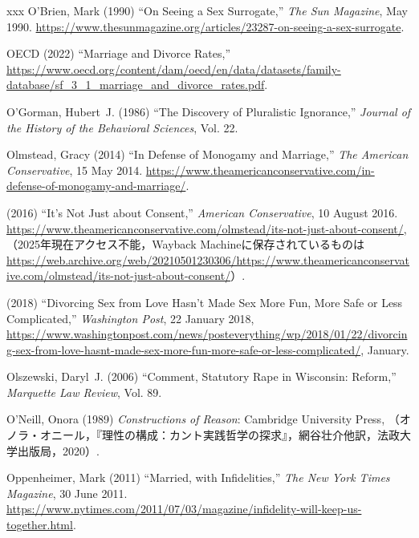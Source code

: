 \documentclass[]{jlreq} \usepackage{mystyle}
\begin{document}
\begin{thebibliography}{xxx}
O'Brien, Mark (1990) ``On Seeing a Sex Surrogate,'' \emph{The Sun Magazine},
  May 1990.
  \url{https://www.thesunmagazine.org/articles/23287-on-seeing-a-sex-surrogate}.

OECD (2022) ``Marriage and Divorce Rates,''
  \url{https://www.oecd.org/content/dam/oecd/en/data/datasets/family-database/sf_3_1_marriage_and_divorce_rates.pdf}.

O'Gorman, Hubert~J. (1986) ``The Discovery of Pluralistic Ignorance,'' \textit{
  Journal of the History of the Behavioral Sciences}, Vol. 22.

Olmstead, Gracy (2014) ``In Defense of Monogamy and Marriage,'' \emph{The
  American Conservative}, 15 May 2014.
  \url{https://www.theamericanconservative.com/in-defense-of-monogamy-and-marriage/}.

 \bysame{}  (2016) ``It's Not Just about Consent,'' \emph{American
  Conservative}, 10 August 2016.
  \url{https://www.theamericanconservative.com/olmstead/its-not-just-about-consent/},
  （2025年現在アクセス不能，Wayback
  Machineに保存されているものは\url{https://web.archive.org/web/20210501230306/https://www.theamericanconservative.com/olmstead/its-not-just-about-consent/}）.

 \bysame{}  (2018) ``Divorcing Sex from Love Hasn't Made Sex More Fun, More
  Safe or Less Complicated,'' \emph{Washington Post}, 22 January 2018,
  \url{https://www.washingtonpost.com/news/posteverything/wp/2018/01/22/divorcing-sex-from-love-hasnt-made-sex-more-fun-more-safe-or-less-complicated/},
  January.

Olszewski, Daryl~J. (2006) ``Comment, Statutory Rape in Wisconsin: Reform,''
  \textit{ Marquette Law Review}, Vol. 89.

O'Neill, Onora (1989)  \textit{ Constructions of Reason}: Cambridge University
  Press,
  （オノラ・オニール，『理性の構成：カント実践哲学の探求』，網谷壮介他訳，法政大学出版局，2020）.

Oppenheimer, Mark (2011) ``Married, with Infidelities,'' \emph{The New York
  Times Magazine}, 30 June 2011.
  \url{https://www.nytimes.com/2011/07/03/magazine/infidelity-will-keep-us-together.html}.


\end{thebibliography}
\end{document}
